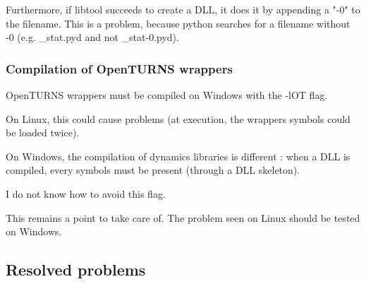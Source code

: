 Furthermore, if libtool succeeds to create a DLL, it does it by appending a "-0" to the filename. This is a problem, because python searches for a filename without -0 (e.g. \_stat.pyd and not \_stat-0.pyd).


\subsubsection{Compilation of OpenTURNS wrappers}

OpenTURNS wrappers must be compiled on Windows with the -lOT flag.

On Linux, this could cause problems (at execution, the wrappers symbols could be loaded twice).

On Windows, the compilation of dynamics libraries is different : when a DLL is compiled, every symbols must be present (through a DLL skeleton).

I do not know how to avoid this flag.

This remains a point to take care of. The problem seen on Linux should be tested on Windows.

\subsection{Resolved problems}

